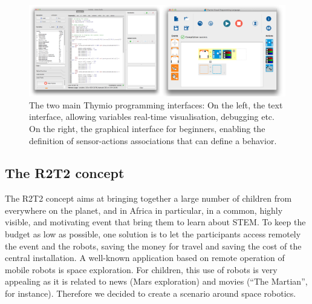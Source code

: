 \documentclass{intech-journal}
\begin{document}
\begin{figure}[ht]
 \centering
    \includegraphics[width=0.9\columnwidth]{figures/studio-VPL.png}
  \caption{The two main Thymio programming interfaces: On the left, the text interface, allowing variables real-time visualisation, debugging etc. On the right, the graphical interface for beginners, enabling the definition of sensor-actions associations that can define a behavior.}
  \label{fig:programming} 
\end{figure}

\subsection{The R2T2 concept}

The R2T2 concept aims at bringing together a large number of children from everywhere on the planet, and in Africa in particular, in a common, highly visible, and motivating event that bring them to learn about STEM.
To keep the budget as low as possible, one solution is to let the participants access remotely the event and the robots, saving the money for travel and saving the cost of the central installation.
A well-known application based on remote operation of mobile robots is space exploration.
For children, this use of robots is very appealing as it is related to news (Mars exploration) and movies (``The Martian'', for instance).
Therefore we decided to create a scenario around space robotics.
\end{document}
